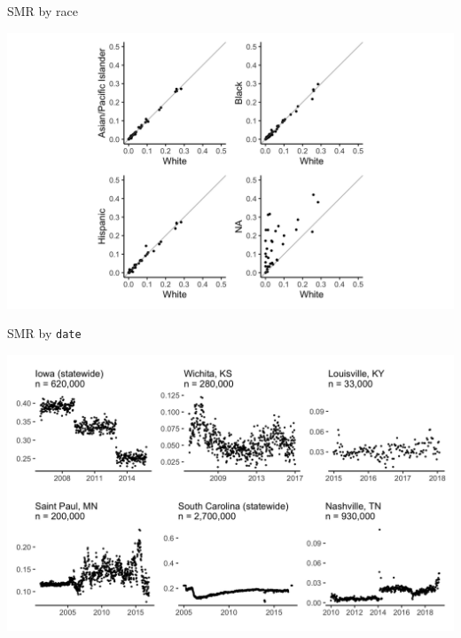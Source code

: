 \documentclass[11pt]{beamer}
\begin{document}
\begin{frame}{SMR by race}
	\begin{center}
	\includegraphics[scale=0.15]{fig/smr_race.png}
	\end{center}
\end{frame}

\begin{frame}{SMR by \texttt{date}}
	\begin{center}
	\includegraphics[scale=0.15]{fig/smr_temporal.png}
	\end{center}
\end{frame}
\end{document}
